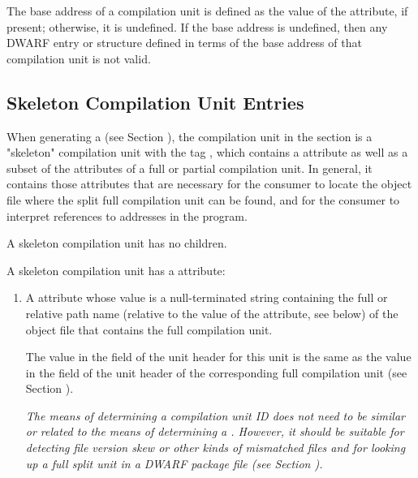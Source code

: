 The  base address of a compilation unit is defined as the
value of the \DWATlowpc{} attribute, if present; otherwise,
it is undefined. If the base address is undefined, then any
DWARF entry or structure defined in terms of the base address
of that compilation unit is not valid.

\subsection{Skeleton Compilation Unit Entries}
\label{chap:skeletoncompilationunitentries}
When generating a \splitDWARFobjectfile{} (see 
Section ), the
compilation unit in the \dotdebuginfo{} section is a "skeleton"
compilation unit with the tag 
\DWTAGskeletonunitTARG, which contains a
\DWATdwoname{} attribute as well as a subset of the
attributes of a full or partial compilation unit. In general,
it contains those attributes that are necessary for the consumer
to locate the object file where the split full compilation unit
can be found, and for the consumer to interpret references to
addresses in the program. 


A skeleton compilation unit has no children.

A skeleton compilation unit has a \DWATdwoname{} attribute:

\begin{enumerate}[1. ]

\item {}
A \DWATdwonameDEFN{} attribute
whose value is a
null-terminated string containing the full or relative
path name (relative to the value of the \DWATcompdir{} attribute, 
see below) of the object file that contains the full
compilation unit.

The value in the \HFNdwoid{} field of the unit header for 
this unit is the same as the value in the \HFNdwoid{} field 
of the unit header of the corresponding full compilation 
unit (see Section ).
        
\textit{The means of determining a compilation unit ID does 
not need to be similar or related to the means of 
determining a \TUsignature. However, it should 
be suitable for detecting file version skew or other 
kinds of mismatched files and for looking up a full
split unit in a DWARF package file 
(see Section ).}

\end{enumerate}

